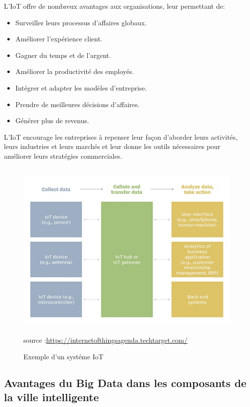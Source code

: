 \documentclass[french, a4paper, 12pt]{report}
\begin{document}
L'IoT offre de nombreux avantages aux organisations, leur permettant de:
\begin{itemize}
\item \textbf{}Surveiller leurs processus d'affaires globaux. 
\item \textbf{}Améliorer l'expérience client.
\item \textbf{}Gagner du temps et de l'argent. 
\item \textbf{}Améliorer la productivité des employés. 
\item \textbf{}Intégrer et adapter les modèles d'entreprise. 
\item \textbf{}Prendre de meilleures décisions d'affaires. 
\item \textbf{}Générer plus de revenus.
\end{itemize}
L'IoT encourage les entreprises à repenser leur façon d'aborder leurs activités, leurs industries et leurs marchés et leur donne les outils nécessaires pour améliorer leurs stratégies commerciales.
\begin{figure}[!ht]
    \centering
    \includegraphics[height=9cm]{images/iot_system.jpg}
    \scriptsize{source :\url{https://internetofthingsagenda.techtarget.com/}}
    \caption{Exemple d'un systéme IoT}
    \label{fig:1.2}
\end{figure}
\subsection{Avantages du Big Data dans les composants de la ville intelligente}
\end{document}

